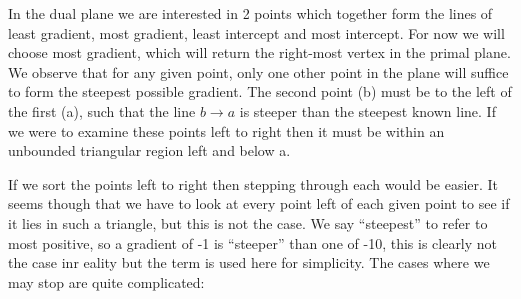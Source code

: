 \documentclass{article}
\begin{document}
In the dual plane we are interested in 2 points which together form the lines of least gradient, most gradient, least intercept and most intercept.
For now we will choose most gradient, which will return the right-most vertex in the primal plane.
We observe that for any given point, only one other point in the plane will suffice to form the steepest possible gradient.
The second point (b) must be to the left of the first (a), such that the line $b \rightarrow a$ is steeper than the steepest known line.
If we were to examine these points left to right then it must be within an unbounded triangular region left and below a.

If we sort the points left to right then stepping through each would be easier.
It seems though that we have to look at every point left of each given point to see if it lies in such a triangle, but this is not the case.
We say ``steepest'' to refer to most positive, so a gradient of -1 is ``steeper'' than one of -10, this is clearly not the case inr eality but the term is used here for simplicity.
The cases where we may stop are quite complicated:
\end{document}
